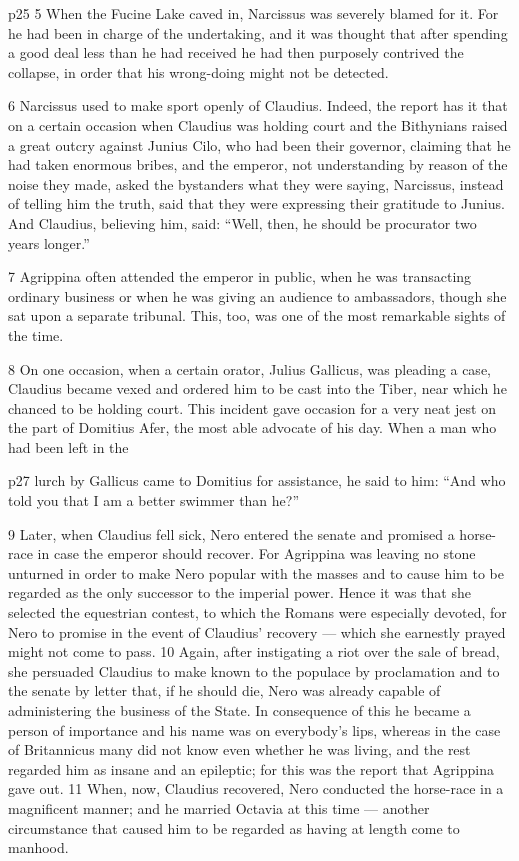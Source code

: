 p25
5
When the Fucine Lake caved in, Narcissus was severely blamed for it. For he had been in charge of the undertaking, and it was thought that after spending a good deal less than he had received he had then purposely contrived the collapse, in order that his wrong-doing might not be detected.

6
Narcissus used to make sport openly of Claudius. Indeed, the report has it that on a certain occasion when Claudius was holding court and the Bithynians raised a great outcry against Junius Cilo, who had been their governor, claiming that he had taken enormous bribes, and the emperor, not understanding by reason of the noise they made, asked the bystanders what they were saying, Narcissus, instead of telling him the truth, said that they were expressing their gratitude to Junius. And Claudius, believing him, said: ``Well, then, he should be procurator two years longer.''

7
Agrippina often attended the emperor in public, when he was transacting ordinary business or when he was giving an audience to ambassadors, though she sat upon a separate tribunal. This, too, was one of the most remarkable sights of the time.

8
On one occasion, when a certain orator, Julius Gallicus, was pleading a case, Claudius became vexed and ordered him to be cast into the Tiber, near which he chanced to be holding court. This incident gave occasion for a very neat jest on the part of Domitius Afer, the most able advocate of his day. When a man who had been left in the

p27 lurch by Gallicus came to Domitius for assistance, he said to him: ``And who told you that I am a better swimmer than he?''

9
Later, when Claudius fell sick, Nero entered the senate and promised a horse-race in case the emperor should recover. For Agrippina was leaving no stone unturned in order to make Nero popular with the masses and to cause him to be regarded as the only successor to the imperial power. Hence it was that she selected the equestrian contest, to which the Romans were especially devoted, for Nero to promise in the event of Claudius' recovery \texthebrew{—} which she earnestly prayed might not come to pass. 10 Again, after instigating a riot over the sale of bread, she persuaded Claudius to make known to the populace by proclamation and to the senate by letter that, if he should die, Nero was already capable of administering the business of the State. In consequence of this he became a person of importance and his name was on everybody's lips, whereas in the case of Britannicus many did not know even whether he was living, and the rest regarded him as insane and an epileptic; for this was the report that Agrippina gave out. 11 When, now, Claudius recovered, Nero conducted the horse-race in a magnificent manner; and he married Octavia at this time \texthebrew{—} another circumstance that caused him to be regarded as having at length come to manhood.

